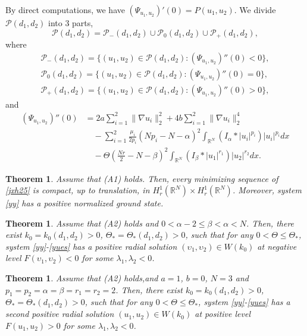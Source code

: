 \documentclass[10pt,a4paper]{amsart}
\numberwithin{equation}{section}
\newtheorem{theorem}[theo]{Theorem}
\begin{document}
By direct computations, we have $(\Psi_{u_1,u_2})'(0)=P(u_1,u_2)$.
We divide $\mathcal{P}(d_1,d_2)$ into 3 parts,
\[
\mathcal{P}(d_1,d_2)= \mathcal{P}_{-}(d_1,d_2)\cup\mathcal{P}_{0}(d_1,d_2)
\cup\mathcal{P}_{+}(d_1,d_2),
\]
 where
\begin{gather*}
\mathcal{P}_{-}(d_1,d_2)=\{(u_1,u_2)\in\mathcal{P}(d_1,d_2):(\Psi_{u_1,u_2})''(0)<0\},\\
\mathcal{P}_{0}(d_1,d_2)=\{(u_1,u_2)\in\mathcal{P}(d_1,d_2):(\Psi_{u_1,u_2})''(0)=0\},\\
\mathcal{P}_{+}(d_1,d_2)=\{(u_1,u_2)\in\mathcal{P}(d_1,d_2):(\Psi_{u_1,u_2})''(0)>0\},
\end{gather*}
and
\begin{align*}
(\Psi_{u_1,u_2})''(0)
&=2a\sum_{i=1}^2\|\nabla u_i\|_2^2+4b\sum_{i=1}^2\|\nabla u_i\|_2^4 \\
&\quad -\sum_{i=1}^2\frac{\mu_i}{2p_i}(Np_i-N-\alpha)^2
\int_{\mathbb{R}^N}(I_\alpha\ast|u_i|^{p_i})|u_i|^{p_i}dx \\
&\quad -\Theta(\frac{Nr}{2}-N-\beta)^2
 \int_{\mathbb{R}^N}(I_\beta\ast|u_1|^{r_1})|u_2|^{r_2}dx.
\end{align*}


\setcounter{theo}{1}
\begin{theorem} \label{thm1.1}
Assume that {\rm (A1)} holds. Then, every minimizing sequence of \eqref{jxh25}
is compact, up to translation, in
$H^1_r(\mathbb{R}^N)\times H^1_r(\mathbb{R}^N)$.
Moreover, system \eqref{yy} has a positive normalized ground state.
\end{theorem}


\begin{theorem} \label{thm1.2}
Assume that {\rm (A2)} holds and $0<\alpha-2\leq\beta<\alpha<N$.
Then, there exist $k_0=k_0(d_1,d_2)>0$, $\Theta_*=\Theta_*(d_1,d_2)>0$, such that
for any $0<\Theta\leq\Theta_*$,
system \eqref{yy}-\eqref{yues} has a positive radial solution
$(\upsilon_1,\upsilon_2)\in W(k_0)$ at negative
level $F(\upsilon_1,\upsilon_2)<0$ for some $\lambda_1,\lambda_2<0$.
 \end{theorem}

\begin{theorem} \label{thm1.3}
Assume that {\rm (A2)} holds,and $a=1$, $b=0$, $N=3$ and
$p_1=p_2=\alpha=\beta=r_1=r_2=2$. Then, there exist
$k_0= k_0(d_1,d_2)>0$, $\Theta_*=\Theta_*(d_1,d_2)>0$, such that for any
$0<\Theta\leq\Theta_*$,
system \eqref{yy}-\eqref{yues} has a second positive radial solution
$(u_1,u_2)\in W(k_0)$ at positive level $F(u_1,u_2)>0$
 for some $\lambda_1,\lambda_2<0$.
\end{theorem}
\end{document}
